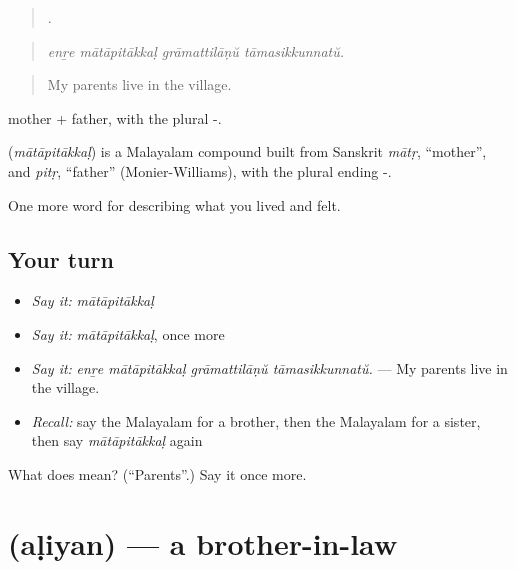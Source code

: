 \begin{quote}
   .
\end{quote}

\begin{quote}
\emph{enṟe mātāpitākkaḷ grāmattilāṇŭ tāmasikkunnatŭ.}
\end{quote}

\begin{quote}
My parents live in the village.
\end{quote}

 mother +  father, with the plural -.

\begin{cousinweb}
\textbf{} (\emph{mātāpitākkaḷ}) is a Malayalam compound built from Sanskrit \emph{mātṛ}, \textquotedblleft{}mother\textquotedblright{}, and \emph{pitṛ}, \textquotedblleft{}father\textquotedblright{} (Monier-Williams), with the plural ending -.
\end{cousinweb}

\begin{grammarlens}[title={What you've built}]
One more word for describing what you lived and felt.
\end{grammarlens}

\subsection*{Your turn}
\begin{itemize}
\raggedright
  \item \emph{Say it:} \emph{mātāpitākkaḷ}
  \item \emph{Say it:} \emph{mātāpitākkaḷ}, once more
  \item \emph{Say it:} \emph{enṟe mātāpitākkaḷ grāmattilāṇŭ tāmasikkunnatŭ.} — My parents live in the village.
  \item \emph{Recall:} say the Malayalam for a brother, then the Malayalam for a sister, then say \emph{mātāpitākkaḷ} again
\end{itemize}

\begin{tcolorbox}[breakable,colback=teal!4,colframe=teal!35!black,title={Before you move on}]
What does  mean? (\textquotedblleft{}Parents\textquotedblright{}.) Say it once more.
\end{tcolorbox}
\section[\texorpdfstring{\ml{അളിയൻ} (aḷiyan)}{അളിയൻ (aḷiyan)}]{ (aḷiyan) — a brother-in-law}

